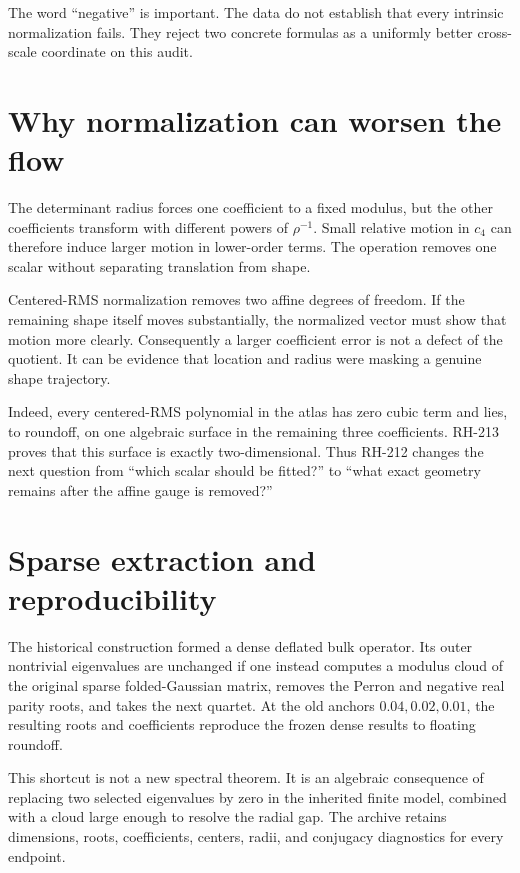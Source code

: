 \documentclass[12pt]{article}
\theoremstyle{remark}\newtheorem{remark}[theorem]{Remark}
\begin{document}
The word ``negative'' is important.  The data do not establish that every
intrinsic normalization fails.  They reject two concrete formulas as a
uniformly better cross-scale coordinate on this audit.

\section{Why normalization can worsen the flow}

The determinant radius forces one coefficient to a fixed modulus, but the
other coefficients transform with different powers of $\rho^{-1}$.  Small
relative motion in $c_4$ can therefore induce larger motion in lower-order
terms.  The operation removes one scalar without separating translation from
shape.

Centered-RMS normalization removes two affine degrees of freedom.  If the
remaining shape itself moves substantially, the normalized vector must show
that motion more clearly.  Consequently a larger coefficient error is not a
defect of the quotient.  It can be evidence that location and radius were
masking a genuine shape trajectory.

Indeed, every centered-RMS polynomial in the atlas has zero cubic term and
lies, to roundoff, on one algebraic surface in the remaining three
coefficients.  RH-213 proves that this surface is exactly two-dimensional.
Thus RH-212 changes the next question from ``which scalar should be fitted?''
to ``what exact geometry remains after the affine gauge is removed?''

\section{Sparse extraction and reproducibility}

The historical construction formed a dense deflated bulk operator.  Its
outer nontrivial eigenvalues are unchanged if one instead computes a modulus
cloud of the original sparse folded-Gaussian matrix, removes the Perron and
negative real parity roots, and takes the next quartet.  At the old anchors
$0.04,0.02,0.01$, the resulting roots and coefficients reproduce the frozen
dense results to floating roundoff.

This shortcut is not a new spectral theorem.  It is an algebraic consequence
of replacing two selected eigenvalues by zero in the inherited finite model,
combined with a cloud large enough to resolve the radial gap.  The archive
retains dimensions, roots, coefficients, centers, radii, and conjugacy
diagnostics for every endpoint.
\end{document}
